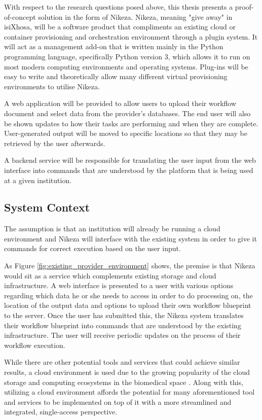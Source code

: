 With respect to the research questions posed above, this thesis presents a proof-of-concept solution in the form of Nikeza. Nikeza, meaning "give away" in isiXhosa, will be a software product that compliments an existing cloud or container provisioning and orchestration environment through a plugin system. It will act as a management add-on that is written mainly in the Python programming language, specifically Python version 3, which allows it to run on most modern computing environments and operating systems. Plug-ins will be easy to write and theoretically allow many different virtual provisioning environments to utilise Nikeza.

A web application will be provided to allow users to upload their workflow document and select data from the provider's databases. The end user will also be shown updates to how their tasks are performing and when they are complete. User-generated output will be moved to specific locations so that they may be retrieved by the user afterwards.

A backend service will be responsible for translating the user input from the web interface into commands that are understood by the platform that is being used at a given institution.

\subsection{System Context}

The assumption is that an institution will already be running a cloud environment and Nikeza will interface with the existing system in order to give it commands for correct execution based on the user input.

As Figure \ref{fig:existing_provider_environment} shows, the premise is that Nikeza would sit as a service which complements existing storage and cloud infrastructure. A web interface is presented to a user with various options regarding which data he or she needs to access in order to do processing on, the location of the output data and options to upload their own workflow blueprint to the server. Once the user has submitted this, the Nikeza system translates their workflow blueprint into commands that are understood by the existing infrastructure. The user will receive periodic updates on the process of their workflow execution.

While there are other potential tools and services that could achieve similar results, a cloud environment is used due to the growing popularity of the cloud storage and computing ecosystems in the biomedical space \parencite{navale2018cloud,connor2016climb,afgan2015genomics,liu2014cloud}. Along with this, utilizing a cloud environment affords the potential for many aforementioned tool and services to be implemented on top of it with a more streamlined and integrated, single-access perspective.

